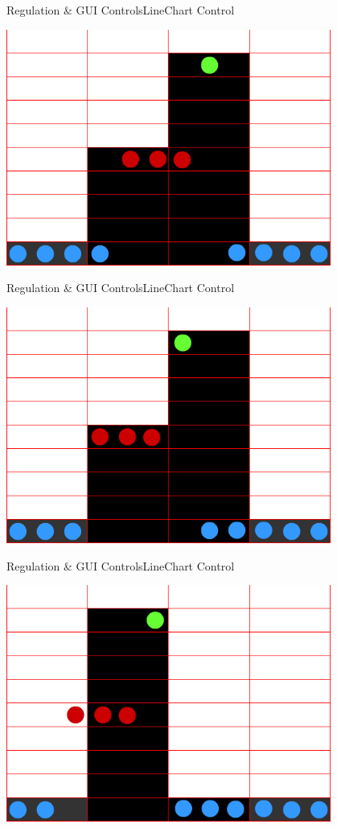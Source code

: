 	\begin{frame}{Regulation \& GUI Controls}{LineChart Control}
	\begin{center}			
		\includegraphics[width=0.8\textwidth]{../regulation/TooManySamples030003.png}
	\end{center}
	\end{frame}
	
	\begin{frame}{Regulation \& GUI Controls}{LineChart Control}
	\begin{center}			
		\includegraphics[width=0.8\textwidth]{../regulation/TooManySamples030004.png}
	\end{center}
	\end{frame}
	
	\begin{frame}{Regulation \& GUI Controls}{LineChart Control}
	\begin{center}			
		\includegraphics[width=0.8\textwidth]{../regulation/TooManySamples030005.png}
	\end{center}
	\end{frame}


